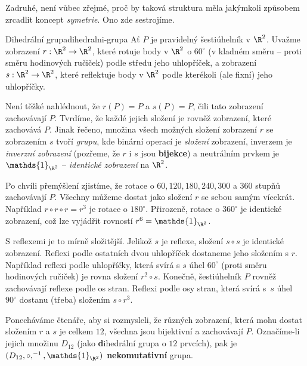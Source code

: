 Zadruhé, není vůbec zřejmé, proč by taková struktura měla jakýmkoli způsobem
zrcadlit koncept \emph{symetrie}. Ono  zde sestrojíme.

\begin{example}{Dihedrální grupa}{dihedralni-grupa}
 Ať $P$ je pravidelný šestiúhelník v $\R^2$. Uvažme zobrazení $r:\R^2 \to \R^2$,
 které rotuje body v $\R^2$ o $60^{ \circ }$ (v kladném směru -- proti směru
 hodinových ručiček) podle středu jeho uhlopříček, a zobrazení $s:\R^2 \to
 \R^2$, které reflektuje body v $\R^2$ podle kterékoli (ale fixní) jeho
 uhlopříčky.

 Není těžké nahlédnout, že $r(P) = P$ a $s(P) = P$, čili tato zobrazení
 zachovávají $P$. Tvrdíme, že každé jejich složení je rovněž zobrazení, které
 zachovává $P$. Jinak řečeno, množina všech možných složení zobrazení $r$ se
 zobrazením $s$ tvoří \emph{grupu}, kde binární operací je \emph{složení}
 zobrazení, inverzem je \emph{inverzní zobrazení} (pozřeme, že $r$ i $s$ jsou
 \textbf{bijekce}) a neutrálním prvkem je $\mathds{1}_{\R^2}$ -- \emph{identické
 zobrazení} na $\R^2$.

 Po chvíli přemýšlení zjistíme, že rotace o $60,120,180,240,300$ a $360$ stupňů
 zachovávají $P$. Všechny můžeme dostat jako složení $r$ se sebou samým
 vícekrát. Například $r \circ r \circ r = r^3$ je rotace o $180^{ \circ }$.
 Přirozeně, rotace o $360^{ \circ }$ je identické zobrazení, což lze vyjádřit
 rovností $r^{6} = \mathds{1}_{\R^2}$.

 S reflexemi je to mírně složitější. Jelikož $s$ je reflexe, složení $s \circ s$
 je identické zobrazení. Reflexi podle ostatních dvou uhlopříček dostaneme jeho
 složením s $r$. Například reflexi podle uhlopříčky, která svírá s $s$ úhel
 $60^{ \circ }$ (proti směru hodinových ručiček) je rovna složení $r^2 \circ s$.
 Konečně, šestiúhelník $P$ rovněž zachovávají reflexe podle os stran. Reflexi
 podle osy stran, která svírá s~$s$ úhel $90^{ \circ }$ dostanu (třeba) složením
 $s \circ r^3$.

 Ponecháváme čtenáře, aby si rozmysleli, že různých zobrazení, která mohu dostat
 složením $r$ a $s$ je celkem $12$, všechna jsou bijektivní a zachovávají $P$.
 Označíme-li jejich množinu $D_{12}$ (jako \textbf{d}ihedrální grupa o $12$
 prvcích), pak je $(D_{12}, \circ ,^{-1},\mathds{1}_{\R^2})$
 \textbf{nekomutativní} grupa.

 \begin{figure}[H]
  \centering
  \begin{subfigure}[b]{\textwidth}
   \centering
\end{subfigure}
\end{figure}
\end{example}
